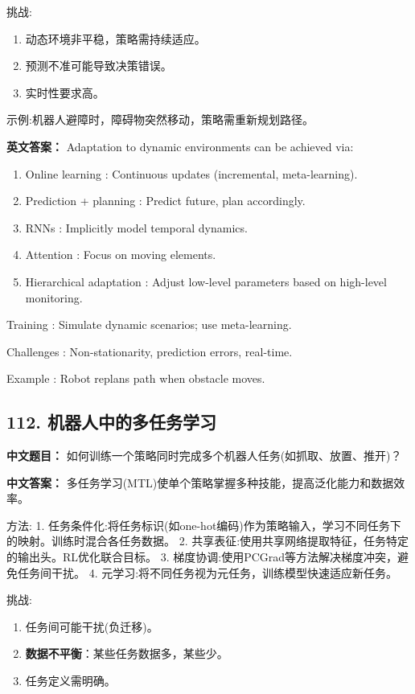 \documentclass[10pt,a4paper]{ctexart}
\begin{document}
 挑战:
\begin{enumerate}
    \item 动态环境非平稳，策略需持续适应。
    \item 预测不准可能导致决策错误。
    \item 实时性要求高。
\end{enumerate}

 示例:机器人避障时，障碍物突然移动，策略需重新规划路径。

\textbf{英文答案：}  
Adaptation to dynamic environments can be achieved via:
\begin{enumerate}
    \item Online learning : Continuous updates (incremental, meta-learning).
    \item Prediction + planning : Predict future, plan accordingly.
    \item RNNs : Implicitly model temporal dynamics.
    \item Attention : Focus on moving elements.
    \item Hierarchical adaptation : Adjust low-level parameters based on high-level monitoring.
\end{enumerate}

 Training : Simulate dynamic scenarios; use meta-learning.

 Challenges : Non-stationarity, prediction errors, real-time.

 Example : Robot replans path when obstacle moves.

\subsection*{112. 机器人中的多任务学习}
\textbf{中文题目：} 如何训练一个策略同时完成多个机器人任务(如抓取、放置、推开)？

\textbf{中文答案：}  
多任务学习(MTL)使单个策略掌握多种技能，提高泛化能力和数据效率。

 方法:
1.  任务条件化:将任务标识(如one-hot编码)作为策略输入，学习不同任务下的映射。训练时混合各任务数据。
2.  共享表征:使用共享网络提取特征，任务特定的输出头。RL优化联合目标。
3.  梯度协调:使用PCGrad等方法解决梯度冲突，避免任务间干扰。
4.  元学习:将不同任务视为元任务，训练模型快速适应新任务。

 挑战:
\begin{enumerate}
    \item 任务间可能干扰(负迁移)。
    \item \textbf{数据不平衡}：某些任务数据多，某些少。
    \item 任务定义需明确。
\end{enumerate}
\end{document}
